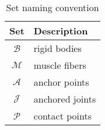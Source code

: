 \documentclass[a4paper,10pt]{article}
\begin{document}
\begin{landscape}
\begin{table}[h!b!p!]
\caption{Set naming convention}
\centering
\begin{tabular}{ c l }
\hline
Set              & Description                  \\
\hline
$\mathcal{B}$    & rigid bodies                 \\
$\mathcal{M}$    & muscle fibers                \\
$\mathcal{A}$    & anchor points                \\
$\mathcal{J}$    & anchored joints              \\
$\mathcal{P}$    & contact points               \\
\hline
\end{tabular}
\end{table}

\end{landscape}
\end{document}
